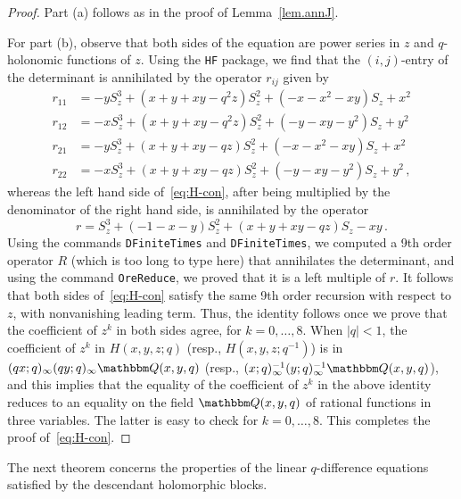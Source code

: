 \documentclass[12pt,reqno]{amsart}
\theoremstyle{definition}
\def\BQ{\mathbbm Q}
\begin{document}
\begin{proof}
Part (a) follows as in the proof of Lemma~\ref{lem.annJ}.

For part (b), observe that both sides of the equation are 
power series in $z$ and $q$-holonomic functions of $z$. Using the
\texttt{HF} package, we find that the $(i,j)$-entry
of the determinant is annihilated by the operator $r_{ij}$ given by
\begin{align*}
  r_{11} &=
  -y S_z^3 + (x + y + x y - q^2 z) S_z^2  + (-x - x^2 - x y) S_z + x^2
\\
r_{12} &=
-x S_z^3 + (x + y + x y - q^2 z) S_z^2 + (-y - x y - y^2) S_z + y^2
\\
r_{21} &=
-y S_z^3 + (x + y + x y - q z)  S_z^2 + (-x - x^2 - x y) S_z + x^2
\\
r_{22} &=
-x S_z^3 + (x + y + x y - q z) S_z^2 + (-y - x y - y^2) S_z + y^2 \,,
 \end{align*}
 whereas the left hand side of~\eqref{eq:H-con}, after being multiplied
 by the denominator of the right hand side, is annihilated by the
 operator
 \begin{equation}
 r= S_z^3 + (-1 - x - y)  S_z^2 + (x + y + x y - q z) S_z - x y \,.
 \end{equation}
 Using the commands \texttt{DFiniteTimes} and \texttt{DFiniteTimes},
 we computed a 9th order operator $R$ (which is too long to type here)
 that annihilates the determinant, and using the command
 \texttt{OreReduce}, we proved that it is a left multiple of $r$. It
 follows that both sides of~\eqref{eq:H-con} satisfy the same 9th
 order recursion with respect to $z$, with nonvanishing leading
 term. Thus, the identity follows once we prove that the coefficient
 of $z^k$ in both sides agree, for $k=0,\dots,8$. When $|q|<1$, the
 coefficient of $z^k$ in $H(x,y,z;q)$ (resp., $H(x,y,z;q^{-1})$) is in
 $(qx;q)_\infty(qy;q)_\infty \BQ(x,y,q)$ (resp.,
 $(x;q)_\infty^{-1}(y;q)_\infty^{-1} \BQ(x,y,q)$), and this implies
 that the equality of the coefficient of $z^k$ in the above identity
 reduces to an equality on the field $\BQ(x,y,q)$ of rational
 functions in three variables. The latter is easy to check for
 $k=0,\dots,8$. This completes the proof of~\eqref{eq:H-con}.
\end{proof}

The next theorem concerns the properties of the linear $q$-difference
equations satisfied by the descendant holomorphic blocks.
\end{document}

